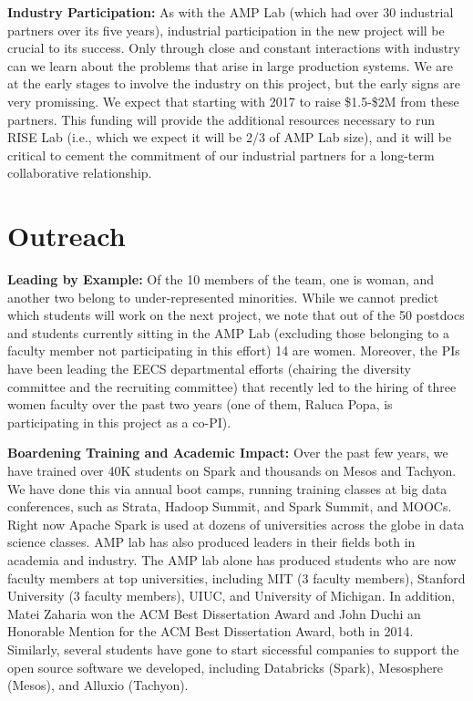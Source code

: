 {\bf Industry Participation:} As with the AMP  Lab (which had over 30 industrial partners over its five years), industrial participation in the new project will be crucial to its success.  Only through close and constant interactions with industry can we learn about the problems that arise in large production systems.  We are at the early stages to involve the industry on this project, but the early signs are very promissing. We expect that starting with 2017 to raise \$1.5-\$2M from these partners. This funding will provide the additional resources necessary to run RISE Lab (i.e., which we expect it will be 2/3 of AMP Lab size), and it will be critical to cement the commitment of our industrial partners for a long-term collaborative relationship.

\section{Outreach}


{\bf Leading by Example:} Of the 10 members of the team, one is woman, and another two belong to under-represented minorities.  While we cannot predict which students will work on the next project, we note that out of the 50 postdocs and students currently sitting in the AMP Lab (excluding those belonging to a faculty member not participating in this effort) 14 are women.  Moreover, the PIs have been leading the EECS departmental efforts (chairing the diversity committee and the recruiting committee) that recently led to the hiring of three women faculty over the past two years (one of them, Raluca Popa, is participating in this project as a co-PI).

{\bf Boardening Training and Academic Impact:} Over the past few years, we have trained over 40K students on Spark and thousands on Mesos and Tachyon. We have done this via annual boot camps, running training classes at big data conferences, such as Strata, Hadoop Summit, and Spark Summit, and MOOCs.  Right now Apache Spark is used at dozens of universities across the globe in data science classes. AMP lab has also produced leaders in their fields both in academia and  industry. The AMP lab alone has produced students who are now faculty members at top universities, including MIT (3 faculty members), Stanford University (3 faculty members), UIUC, and University of Michigan. In addition, Matei Zaharia won the ACM Best Dissertation Award and John Duchi an Honorable Mention for the ACM Best Dissertation Award, both in 2014. Similarly, several students have gone to start siccessful companies to support the open source software we developed, including Databricks (Spark), Mesosphere (Mesos), and Alluxio (Tachyon). 

